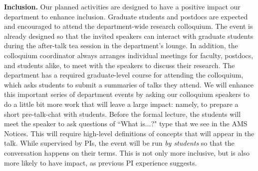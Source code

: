 \documentclass[11pt]{NSFamsart}
\begin{document}
{{\bf Inclusion.} Our planned activities are designed to have a positive impact our department  to enhance {inclusion}. 
Graduate students and postdocs are expected and encouraged to attend the department-wide research colloquium. The event is already designed so that the invited speakers can interact with graduate students during the after-talk tea session in the department's lounge. In addition, the colloquium coordinator always 
arranges individual meetings for faculty, postdocs, and students alike, %
to meet with the speakers to discuss their research.  The department has a required graduate-level course for attending the colloquium, which asks students to submit a summaries of talks they attend. 
We will enhance this important series of department events by asking our colloquium speakers to do a little bit more work that will leave a large impact: namely, to prepare a short pre-talk-chat with students. Before the formal lecture, the students will meet the speaker to ask questions of ``What is...?" type that we see in the AMS Notices. This will require high-level definitions of concepts that will appear in the talk. While supervised by PIs,  the event will be run \emph{by students} so that the conversation happens on their terms. This is not only more inclusive, but is also more likely to have impact, as previous PI experience suggests.  






}
\end{document}
